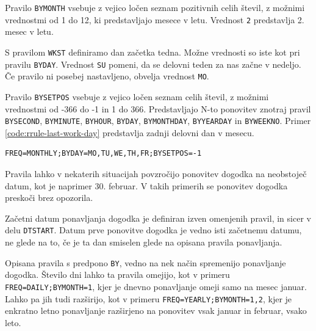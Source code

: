 Pravilo \texttt{BYMONTH} vsebuje z vejico ločen seznam pozitivnih celih števil, z možnimi vrednostmi od 1 do 12, ki predstavljajo mesece v letu. Vrednost \texttt{2} predstavlja 2. mesec v letu.

S pravilom \texttt{WKST} definiramo dan začetka tedna. Možne vrednosti so iste kot pri pravilu \texttt{BYDAY}. Vrednost \texttt{SU} pomeni, da se delovni teden za nas začne v nedeljo. Če pravilo ni posebej nastavljeno, obvelja vrednost \texttt{MO}.

Pravilo \texttt{BYSETPOS} vsebuje z vejico ločen seznam celih števil, z možnimi vrednostmi od -366 do -1 in 1 do 366. Predstavljajo N-to ponovitev znotraj pravil \texttt{BYSECOND}, \texttt{BYMINUTE}, \texttt{BYHOUR}, \texttt{BYDAY}, \texttt{BYMONTHDAY}, \texttt{BYYEARDAY} in \texttt{BYWEEKNO}. Primer \ref{code:rrule-last-work-day} predstavlja zadnji delovni dan v mesecu.

\begin{lstlisting}[caption=Primer uporabe pravila za zadnji delovni dan v mesecu., label=code:rrule-last-work-day]
FREQ=MONTHLY;BYDAY=MO,TU,WE,TH,FR;BYSETPOS=-1
\end{lstlisting}

Pravila lahko v nekaterih situacijah povzročijo ponovitev dogodka na neobstoječ datum, kot je naprimer 30. februar. V takih primerih se ponovitev dogodka preskoči brez opozorila.

Začetni datum ponavljanja dogodka je definiran izven omenjenih pravil, in sicer v delu \texttt{DTSTART}. Datum prve ponovitve dogodka je vedno isti začetnemu datumu, ne glede na to, če je ta dan smiselen glede na opisana pravila ponavljanja.

Opisana pravila s predpono \texttt{BY}, vedno na nek način spremenijo ponavljanje dogodka. Število dni lahko ta pravila omejijo, kot v primeru \texttt{FREQ=DAILY;BYMONTH=1}, kjer je dnevno ponavljanje omeji samo na mesec januar. Lahko pa jih tudi razširijo, kot v primeru \texttt{FREQ=YEARLY;BYMONTH=1,2}, kjer je enkratno letno ponavljanje razširjeno na ponovitev vsak januar in februar, vsako leto.

